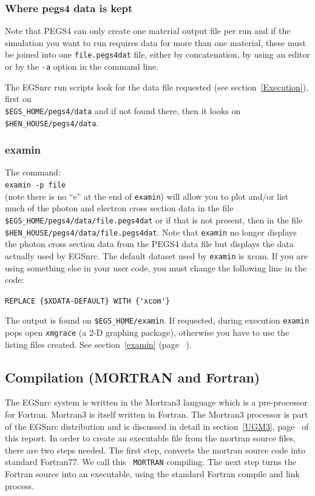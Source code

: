 \subsubsection{Where pegs4 data is kept}
\label{wpdk}

Note that PEGS4 can only create one material output file per run and
if the simulation you want to run requires data for more than one material,
these must be joined into one \verb+file.pegs4dat+ file, either by
concatenation, by using an editor or by the {\tt -a} option in the command
line.

The EGSnrc run scripts look for the data file requested (see
section~\ref{Execution}), first on\\
\verb+$EGS_HOME/pegs4/data+ and if not
found there, then it looks on \verb+$HEN_HOUSE/pegs4/data+.
\vfill

\subsubsection{examin}
The command:\\
\verb+examin -p file+
\\(note there is no ``e'' at the end of \verb+examin+) will allow you
to plot and/or list much of the photon and electron cross section data
in the file \verb+$EGS_HOME/pegs4/data/file.pegs4dat+ or if that is not
present, then in the file \verb+$HEN_HOUSE/pegs4/data/file.pegs4dat+. Note that
\verb+examin+ no longer displays the photon cross section data from the
PEGS4 data file but displays the data actually used by EGSnrc. The default
dataset used by \verb+examin+ is xcom. If you are using something else in your
user code, you must change the following line in the code:

\verb+REPLACE {$XDATA-DEFAULT} WITH {'xcom'}+

The output is found on \verb+$EGS_HOME/examin+. If requested, during execution
\verb+examin+ pops open \verb+xmgrace+ (a 2-D graphing package), otherwise
you have to use the listing files created. See section~\ref{examin}
(page ~\pageref{examin}).

\subsection{Compilation (MORTRAN and Fortran)}
\label{Compilation}


The EGSnrc system is written in the Mortran3 language which is
a pre-processor for Fortran.  Mortran3 is itself written in
Fortran.  The Mortran3 processor is part of the EGSnrc
distribution and is discussed in detail in section~\ref{UGM3},
page~\pageref{UGM3} of this report.  In order to create an executable file
from the mortran source files, there are two steps needed. The first step,
converts the mortran source code into standard Fortran77. We call this {\tt
MORTRAN} compiling.  The next step turns the Fortran source into an
executable, using the standard Fortran compile and link process.

